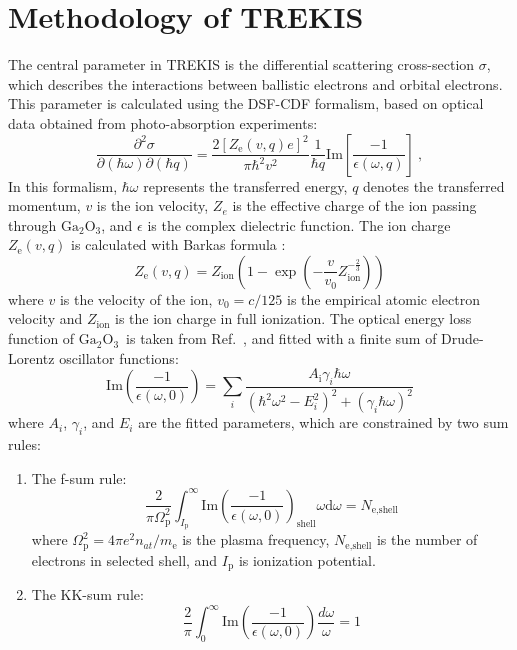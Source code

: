 \documentclass[%
reprint,
superscriptaddress,
 amsmath,amssymb,
 aps,
]{revtex4-2}
\newcommand{\ga}{$\text{Ga}_2\text{O}_3$}
\begin{document}
\section{Methodology of TREKIS}
\label{app:trekis}
The central parameter in TREKIS is the differential scattering cross-section 
$\sigma$, which describes the interactions between ballistic electrons and 
orbital electrons. 
This parameter is calculated using the DSF-CDF formalism, based 
on optical data obtained from photo-absorption experiments: 
\begin{equation} 
\frac{\partial^{2}\sigma}{\partial(\hbar\omega)\partial(\hbar q)} = 
\frac{2[Z_{\text{e}}(v,q)e]^{2}}{\pi\hbar^{2}v^{2}} \frac{1}{\hbar 
q}\mathrm{Im}[\frac{-1}{\epsilon(\omega,q)}]\ , \label{eq1} 
\end{equation} 
In this formalism, $\hbar\omega$ represents the transferred energy, $q$ denotes 
the transferred momentum, $v$ is the ion velocity, $Z_e$ is the effective 
charge of the ion passing through \ga, and $\epsilon$ is the complex 
dielectric function. 
The ion charge $Z_{\text{e}}(v,q)$ is calculated with Barkas formula 
\cite{Gervais1994}: 
\begin{equation} 
Z_{\text{e}}(v,q) = Z_{\text{ion}}(1-\exp(-\frac{v}{v_{0}}Z_{\text{ion}}^{-\frac{2}{3}})) 
\end{equation} 
where $v$ is the velocity of the ion, $v_{0}=c/125$ is the empirical atomic 
electron velocity and $Z_{\text{ion}}$ is the ion charge in full ionization. 
The optical energy loss function of \ga\ is taken from 
Ref.~\cite{he_first-principles_2006}, and fitted with a finite sum of Drude-Lorentz 
oscillator functions: 
\begin{equation} 
\mathrm{Im}(\frac{-1}{\epsilon(\omega,0)}) = \sum_{i} 
\frac{A_{\mathrm{i}}\gamma_{i}\hbar\omega}{(\hbar^{2}\omega^{2}-E_{i}^{2})^{2}+(\gamma_{i}\hbar\omega)^{2}} 
\end{equation} 
where $A_{i}$, $\gamma_{i}$, and $E_{i}$ are the fitted parameters, which are 
constrained by two sum rules: 
\begin{enumerate} 
\item The f-sum rule: 
\begin{equation} 
\frac{2}{\pi 
\Omega_{\text{p}}^{2}}\int_{I_{\text{p}}}^{\infty}\mathrm{Im}(\frac{-1}{\epsilon(\omega,0)})_{\text{shell}}\omega 
\mathrm{d}\omega = N_{\text{e,shell}} 
\end{equation} 
where $\Omega_{\text{p}}^{2}=4\pi e^{2}n_{at}/m_{\text{e}}$ is the plasma frequency, 
$N_{\text{e,shell}}$ is the number of electrons in selected shell, and $I_{\text{p}}$ is 
ionization potential. 
\item The KK-sum rule: 
\begin{equation} 
\frac{2}{\pi}\int_{0}^{\infty} 
\mathrm{Im}(\frac{-1}{\epsilon(\omega,0)})\frac{d\omega}{\omega} = 1 
\end{equation} 
\end{enumerate} 
\end{document}
